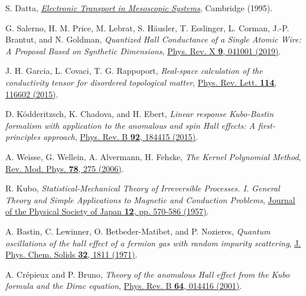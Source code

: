 \documentclass[aps,prb,amsmath,amssymb,twocolumn, superscriptaddress]{revtex4-2}
\begin{document}
\begin{thebibliography}{10}

S. Datta, \href{https://www.cambridge.org/core/books/electronic-transport-in-mesoscopic-systems/1E55DEF5978AA7B843FF70337C220D8B}{\em Electronic Transport in Mesoscopic Systems}, Cambridge (1995).

G. Salerno, H. M. Price, M. Lebrat, S. Häusler, T. Esslinger, L. Corman, J.-P. Brantut, and N. Goldman, {\em Quantized Hall Conductance of a Single Atomic Wire: A Proposal Based on Synthetic Dimensions}, \href{https://journals.aps.org/prx/abstract/10.1103/PhysRevX.9.041001}{Phys. Rev. X {\bfseries 9}, 041001 (2019)}.

J. H. Garcia, L.  Covaci, T. G. Rappoport, {\em Real-space calculation of the conductivity tensor for disordered topological matter}, \href{https://journals.aps.org/prl/abstract/10.1103/PhysRevLett.114.116602}{Phys. Rev. Lett. {\bfseries 114}, 116602 (2015)}.

D. Ködderitzsch, K. Chadova, and H. Ebert, {\em Linear response Kubo-Bastin formalism with application to the anomalous and spin Hall effects: A first-principles approach}, \href{https://journals.aps.org/prb/abstract/10.1103/PhysRevB.92.184415}{Phys. Rev. B {\bfseries 92}, 184415 (2015)}.

A. Weisse, G. Wellein, A. Alvermann, H. Fehske, {\em The Kernel Polynomial Method}, \href{https://journals.aps.org/rmp/abstract/10.1103/RevModPhys.78.275}{Rev. Mod. Phys. {\bfseries 78}, 275 (2006)}.

R. Kubo, {\em Statistical-Mechanical Theory of Irreversible Processes. I. General Theory and Simple Applications to Magnetic and Conduction Problems}, \href{https://journals.jps.jp/doi/10.1143/JPSJ.12.570}{Journal of the Physical Society of Japan {\bfseries 12}, pp. 570-586 (1957)}.

A. Bastin, C. Lewinner, O. Betbeder-Matibet, and P.
Nozieres, {\em Quantum oscillations of the hall effect of a fermion gas with random impurity scattering}, \href{https://www.sciencedirect.com/science/article/pii/S0022369771801476}{ J. Phys. Chem. Solids {\bfseries 32}, 1811 (1971)}.

A. Cr\'epieux and P. Bruno, {\em Theory of the anomalous Hall effect from the Kubo formula and the Dirac equation}, \href{https://journals.aps.org/prb/abstract/10.1103/PhysRevB.64.014416}{Phys. Rev. B {\bfseries 64}, 014416 (2001)}.


\end{thebibliography}
\end{document}
